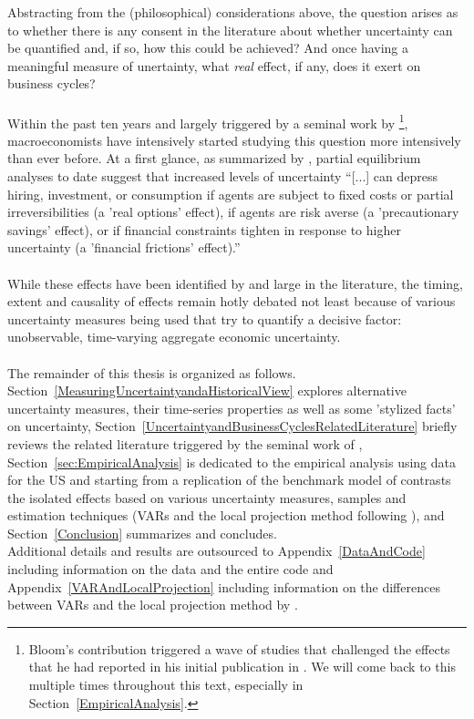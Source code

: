 \documentclass[a4paper,11pt,listof=nochaptergap,oneside,pointednumbers,bibtotoc,bigheadings,liststotoc]{scrbook}
\begin{document}
Abstracting from the (philosophical) considerations above, the question arises as to whether there is any consent in the literature about whether uncertainty can be quantified and, if so, how this could be achieved? And once having a meaningful measure of unertainty, what \textit{real} effect, if any, does it exert on business cycles? \\
\\
Within the past ten years and largely triggered by a seminal work by \citet{bloom:09}\footnote{Bloom's contribution triggered a wave of studies that challenged the effects that he had reported in his initial publication in \citet{bloom:09}. We will come back to this multiple times throughout this text, especially in Section~\ref{EmpiricalAnalysis}.}, macroeconomists have intensively started studying this question more intensively than ever before. At a first glance, as summarized by \citet[p. 1177]{juradoetal:15}, partial equilibrium analyses to date suggest that increased levels of uncertainty ``[...] can depress hiring, investment, or consumption if agents are subject to fixed costs or partial irreversibilities (a 'real options' effect), if agents are risk averse (a 'precautionary savings' effect), or if financial constraints tighten in response to higher uncertainty (a 'financial frictions' effect).'' \\
\\
While these effects have been identified by and large in the literature, the timing, extent and causality of effects remain hotly debated not least because of various uncertainty measures being used that try to quantify a decisive factor: unobservable, time-varying aggregate economic uncertainty.
\\
\\
The remainder of this thesis is organized as follows. Section~\ref{MeasuringUncertaintyandaHistoricalView} explores alternative uncertainty measures, their time-series properties as well as some 'stylized facts' on uncertainty, Section~\ref{UncertaintyandBusinessCyclesRelatedLiterature} briefly reviews the related literature triggered by the seminal work of \citet{bloom:09}, Section~\ref{sec:EmpiricalAnalysis} is dedicated to the empirical analysis using data for the US and starting from a replication of the benchmark model of \citet{bloom:09} contrasts the isolated effects based on various uncertainty measures, samples and estimation techniques (VARs and the local projection method following \citealp{jorda:05}), and Section~\ref{Conclusion} summarizes and concludes. \\
Additional details and results are outsourced to Appendix~\ref{DataAndCode} including information on the data and the entire code and Appendix~\ref{VARAndLocalProjection} including information on the differences between VARs and the local projection method by \citet{jorda:05}.
\end{document}
